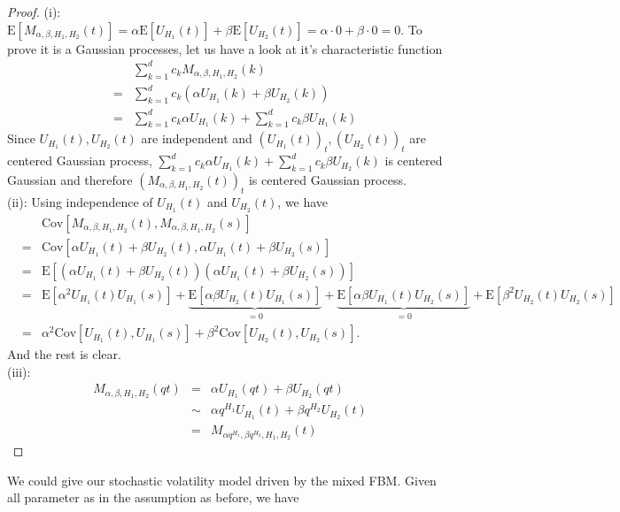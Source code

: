 \documentclass[a4paper, twoside, 11pt]{article}
\theoremstyle{definition}
\begin{document}
\begin{proof}
  (i): $\mathrm{E}[M_{\alpha,\beta,H_1,H_2}(t)] = \alpha \mathrm{E}[U_{H_1}(t)] + \beta \mathrm{E}[U_{H_2}(t)] = \alpha \cdot 0 + \beta \cdot 0 = 0$.
  To prove it is a Gaussian processes, let us have a look at it's characteristic function
  \begin{eqnarray*}
	&&\sum\limits_{k=1}^{d} c_k M_{\alpha,\beta,H_1,H_2}(k)\\
	&=& \sum\limits_{k=1}^{d} c_k (\alpha U_{H_1}(k) + \beta U_{H_2}(k))\\
	&=& \sum\limits_{k=1}^{d} c_k \alpha U_{H_1}(k) + \sum\limits_{k=1}^{d} c_k \beta U_{H_1}(k)
  \end{eqnarray*}
  Since $U_{H_1}(t), U_{H_2}(t)$ are independent and $(U_{H_1}(t))_t, (U_{H_2}(t))_t$ are centered Gaussian process, $\sum\limits_{k=1}^{d} c_k \alpha U_{H_1}(k) + \sum\limits_{k=1}^{d} c_k \beta U_{H_2}(k)$ is centered Gaussian and therefore $(M_{\alpha,\beta,H_1,H_2}(t))_t$ is centered Gaussian process. \\
  (ii): Using independence of $U_{H_1}(t)$ and $U_{H_2}(t)$, we have
  \begin{eqnarray*}
	&&\mathrm{Cov}[M_{\alpha,\beta,H_1,H_2}(t), M_{\alpha,\beta,H_1,H_2}(s)]\\
	&=& \mathrm{Cov}[\alpha U_{H_1}(t)+\beta U_{H_2}(t), \alpha U_{H_1}(t)+\beta U_{H_2}(s)]\\
	&=& \mathrm{E}[(\alpha U_{H_1}(t)+\beta U_{H_2}(t)) (\alpha U_{H_1}(t)+\beta U_{H_2}(s))]\\
	&=& \mathrm{E}[\alpha^2U_{H_1}(t)U_{H_1}(s)] + \underbrace{\mathrm{E}[\alpha \beta U_{H_2}(t)U_{H_1}(s)]}_{=0} + \underbrace{\mathrm{E}[\alpha\beta U_{H_1}(t)U_{H_2}(s)]}_{=0} +\mathrm{E}[\beta^2 U_{H_2}(t)U_{H_2}(s)] \\
	&=& \alpha^2 \mathrm{Cov}[U_{H_1}(t), U_{H_1}(s)] + \beta^2\mathrm{Cov}[U_{H_2}(t), U_{H_2}(s)].
  \end{eqnarray*}
And the rest is clear.\\
(iii): 
\begin{eqnarray*}
  M_{\alpha,\beta,H_1,H_2}(qt) &=&  \alpha U_{H_1}(qt)+\beta U_{H_2}(qt)\\
  &\sim& \alpha q^{H_1} U_{H_1}(t) + \beta q^{H_2} U_{H_2}(t)\\
  &=& M_{\alpha q^{H_1}, \beta q^{H_2}, H_1, H_2}(t)
\end{eqnarray*}
\end{proof}
We could give our stochastic volatility model driven by the mixed FBM. Given all parameter as in the assumption as before, we have 
\end{document}
